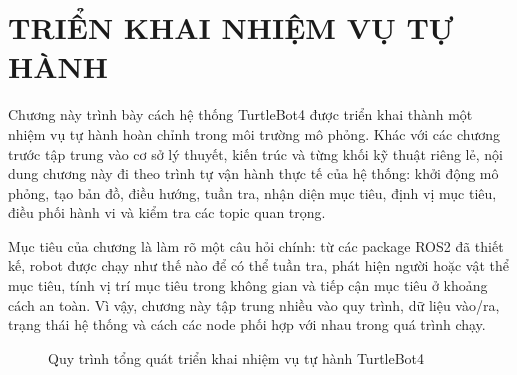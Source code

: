 \providecommand{\placeholderfigure}[3]{%
    \begin{figure}[H]
        \centering
        \fbox{%
            \parbox[c][4.0cm][c]{0.88\textwidth}{%
                \centering
                \textit{#1}%
            }%
        }
        \caption{#2}
        \label{#3}
    \end{figure}
}

\section{TRIỂN KHAI NHIỆM VỤ TỰ HÀNH}
\label{sec:autonomous-mission-deployment}

Chương này trình bày cách hệ thống TurtleBot4 được triển khai thành một nhiệm vụ tự hành hoàn chỉnh trong môi trường mô phỏng. Khác với các chương trước tập trung vào cơ sở lý thuyết, kiến trúc và từng khối kỹ thuật riêng lẻ, nội dung chương này đi theo trình tự vận hành thực tế của hệ thống: khởi động mô phỏng, tạo bản đồ, điều hướng, tuần tra, nhận diện mục tiêu, định vị mục tiêu, điều phối hành vi và kiểm tra các topic quan trọng.

Mục tiêu của chương là làm rõ một câu hỏi chính: từ các package ROS2 đã thiết kế, robot được chạy như thế nào để có thể tuần tra, phát hiện người hoặc vật thể mục tiêu, tính vị trí mục tiêu trong không gian và tiếp cận mục tiêu ở khoảng cách an toàn. Vì vậy, chương này tập trung nhiều vào quy trình, dữ liệu vào/ra, trạng thái hệ thống và cách các node phối hợp với nhau trong quá trình chạy.

\begin{figure}[H]
\centering
{}
\caption{Quy trình tổng quát triển khai nhiệm vụ tự hành TurtleBot4}
\label{fig:autonomous-mission-overview}
\end{figure}

